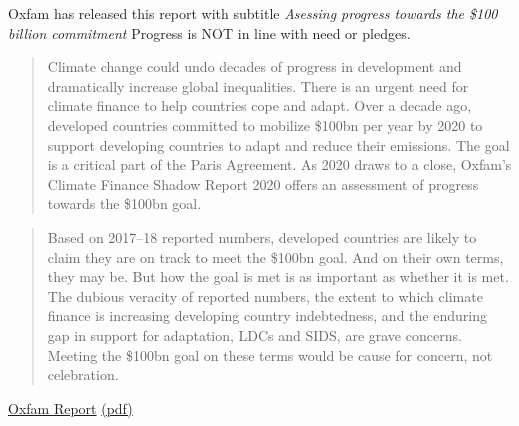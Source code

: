 \documentclass[
]{book}
\begin{document}
Oxfam has released this report with subtitle \emph{Asessing progress towards the \$100 billion commitment}
Progress is NOT in line with need or pledges.

\begin{quote}
Climate change could undo decades of progress in development and dramatically increase global inequalities. There is an urgent need for climate finance to help countries cope and adapt.
Over a decade ago, developed countries committed to mobilize \$100bn per year by 2020 to support developing countries to adapt and reduce their emissions. The goal is a critical part of the Paris Agreement.
As 2020 draws to a close, Oxfam's Climate Finance Shadow Report 2020 offers an assessment of progress towards the \$100bn goal.
\end{quote}

\begin{quote}
Based on 2017--18 reported numbers, developed countries are likely to claim they are on track to meet
the \$100bn goal. And on their own terms, they may be. But how the goal is met is as important as whether
it is met. The dubious veracity of reported numbers, the extent to which climate finance is increasing
developing country indebtedness, and the enduring gap in support for adaptation, LDCs and SIDS, are grave
concerns. Meeting the \$100bn goal on these terms would be cause for concern, not celebration.
\end{quote}

\href{https://www.oxfam.org/en/research/climate-finance-shadow-report-2020}{Oxfam Report}
\href{/pdf/Oxfam_2020_Climate_Finance_Shadow_Report.pdf}{(pdf)}

  
\end{document}
